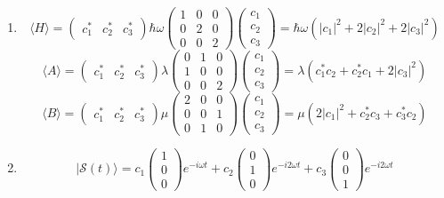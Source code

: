 \begin{enumerate}
\begin{itemize}
    \end{itemize}

    \item 
    $$
    \langle H\rangle
    =
    \begin{pmatrix}
        c_1^* & 
        c_2^* & 
        c_3^*
    \end{pmatrix}
    \hbar\omega
    \begin{pmatrix}
        1 & 0 & 0\\
        0 & 2 & 0\\
        0 & 0 & 2
    \end{pmatrix}
    \begin{pmatrix}
        c_1\\c_2\\c_3
    \end{pmatrix}
    =\hbar\omega
    (|c_1|^2+2|c_2|^2+2|c_3|^2)
    $$
    $$
    \langle A\rangle
    =
    \begin{pmatrix}
        c_1^* & 
        c_2^* & 
        c_3^*
    \end{pmatrix}
    \lambda
    \begin{pmatrix}
        0 & 1 & 0\\
        1 & 0 & 0\\
        0 & 0 & 2
    \end{pmatrix}
    \begin{pmatrix}
        c_1\\c_2\\c_3
    \end{pmatrix}
    =\lambda
    (c_1^*c_2 + c_2^*c_1+2|c_3|^2)
    $$
    $$
    \langle B\rangle
    =
    \begin{pmatrix}
        c_1^* & 
        c_2^* & 
        c_3^*
    \end{pmatrix}
    \mu
    \begin{pmatrix}
        2 & 0 & 0\\
        0 & 0 & 1\\
        0 & 1 & 0
    \end{pmatrix}
    \begin{pmatrix}
        c_1\\c_2\\c_3
    \end{pmatrix}
    =\mu
    (2|c_1|^2+c_2^*c_3+c_3^*c_2)
    $$
    \item 
    $$
    |\mathcal{S}
    (t)
    \rangle
    =
    c_1
    \begin{pmatrix}
        1\\0\\0
    \end{pmatrix}
    e^{-i\omega t}
    +
    c_2
    \begin{pmatrix}
        0\\1\\0
    \end{pmatrix}
    e^{-i2\omega t}
    +
    c_3
    \begin{pmatrix}
        0\\0\\1
    \end{pmatrix}
    e^{-i2\omega t}
    $$


\end{enumerate}
